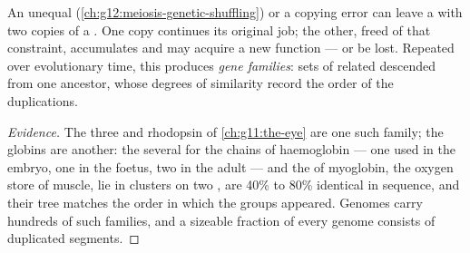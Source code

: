 \begin{proposition}\label{prop:g12:diversification-of-life:duplication}
An unequal  (\cref{ch:g12:meiosis-genetic-shuffling}) or
a copying error can leave a  with two copies of a . One
copy continues its original job; the other, freed of that constraint,
accumulates  and may acquire a new function --- or be lost.
Repeated over evolutionary time, this produces \emph{gene families}:
sets of related  descended from one ancestor, whose degrees of
similarity record the order of the duplications.
\end{proposition}
\begin{proof}[Evidence]
The three  and rhodopsin of \cref{ch:g11:the-eye} are one such
family; the globins are another: the several  for the chains of
haemoglobin --- one used in the embryo, one in the foetus, two in the
adult --- and the  of myoglobin, the oxygen store of muscle, lie
in clusters on two , are 40\% to 80\% identical in
sequence, and their tree matches the order in which the 
groups appeared. Genomes carry hundreds of such families, and a
sizeable fraction of every genome consists of duplicated segments.
\end{proof}

